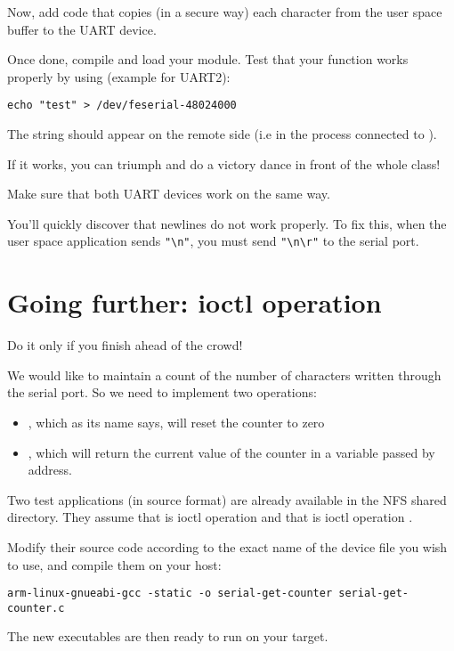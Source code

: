 Now, add code that copies (in a secure way) each character from the
user space buffer to the UART device. 

Once done, compile and load your module. Test that your  function
works properly by using (example for UART2):

\begin{verbatim}
echo "test" > /dev/feserial-48024000
\end{verbatim}

The  string should appear on the remote side (i.e in
the  process connected to ).

If it works, you can triumph and do a victory dance in front of the
whole class!

Make sure that both UART devices work on the same way.

You'll quickly discover that newlines do not work properly. To fix
this, when the user space application sends \verb+"\n"+, you must send
\verb+"\n\r"+ to the serial port.

\section{Going further: ioctl operation}

Do it only if you finish ahead of the crowd!

We would like to maintain a count of the number of characters
written through the serial port. So we need to implement two
 operations:
\begin{itemize}

 \item {}, which as its name says, will
   reset the counter to zero

 \item {}, which will return the current
   value of the counter in a variable passed by address.

\end{itemize}

Two test applications (in source format) are already available in the
 NFS shared directory.  
They assume that  is ioctl operation 
and that  is ioctl operation .

Modify their source code according to the exact name of the device file
you wish to use, and compile them on your host:

\begin{verbatim}
arm-linux-gnueabi-gcc -static -o serial-get-counter serial-get-counter.c
\end{verbatim}

The new executables are then ready to run on your target.
